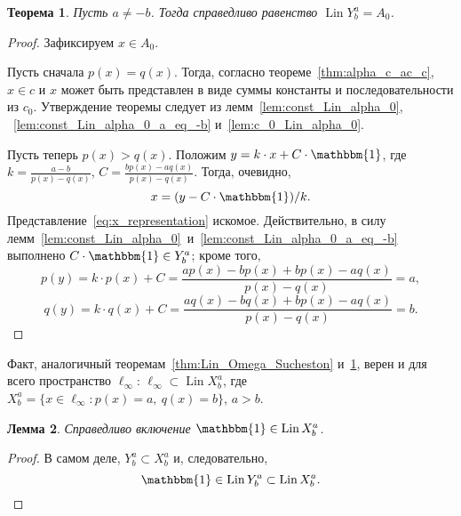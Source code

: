 \documentclass[a4paper,14pt]{article} %
\theoremstyle{plain}
\newtheorem{lemma}{Лемма}[section]
\newtheorem{theorem}[lemma]{Теорема}
\begin{document}
\begin{theorem}
	\label{thm:A_0_c_infty_lin}
	Пусть $a\neq -b$.
	Тогда справедливо равенство $\operatorname{Lin} Y^a_b = A_0$.
\end{theorem}

\begin{proof}
	Зафиксируем $x \in A_0$.

	Пусть сначала $p(x) = q(x)$.
	Тогда, согласно теореме~\ref{thm:alpha_c_ac_c}, $x\in c$
	и $x$ может быть представлен в виде суммы константы и последовательности из $c_0$.
	Утверждение теоремы следует из лемм~\ref{lem:const_Lin_alpha_0}, ~\ref{lem:const_Lin_alpha_0_a_eq_-b} и~\ref{lem:c_0_Lin_alpha_0}.

	Пусть теперь $p(x) > q(x)$.
	Положим $y=k\cdot x + C\cdot\mathbbm{1}$,
	где $k=\frac{a-b}{p(x)-q(x)}$, $C=\frac{bp(x)-aq(x)}{p(x)-q(x)}$.
	Тогда, очевидно,
	\begin{equation}
		\label{eq:x_representation}
		x=(y-C\cdot\mathbbm{1})/k
		.
	\end{equation}
	Представление~\eqref{eq:x_representation} искомое.
	Действительно, в силу лемм~\ref{lem:const_Lin_alpha_0}~и~\ref{lem:const_Lin_alpha_0_a_eq_-b} выполнено
	$C\cdot\mathbbm{1}\in Y^a_b$; кроме того,
	\begin{equation}
		p(y) = k\cdot p(x) + C
		=
		\frac{ap(x)-bp(x)+bp(x)-aq(x)}{p(x)-q(x)}
		=
		a
		,
	\end{equation}
	\begin{equation}
		q(y) = k\cdot q(x) + C
		=
		\frac{aq(x)-bq(x)+bp(x)-aq(x)}{p(x)-q(x)}
		=
		b
		.
	\end{equation}


\end{proof}

Факт, аналогичный теоремам~\ref{thm:Lin_Omega_Sucheston} и~\ref{thm:A_0_c_infty_lin}, верен и для
всего пространство $\ell_\infty$:
$\ell_\infty\subset \operatorname{Lin} X^a_b$, где
$X^a_b = \{x\in\ell_\infty : p(x) = a,~ q(x) = b\}$, $a>b$.


\begin{lemma}
	\label{lem:const_Lin_ell_infty}
	Справедливо включение
	$\mathbbm{1}\in \operatorname{Lin} X^a_b$.
\end{lemma}

\begin{proof}
	В самом деле,
	$Y^a_b \subset X^a_b$
	и, следовательно,
	\begin{equation}
		\mathbbm{1} \in \operatorname{Lin} Y^a_b \subset \operatorname{Lin} X^a_b
		.
	\end{equation}
\end{proof}
\end{document}
